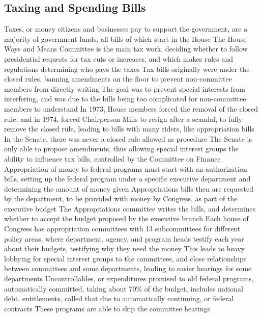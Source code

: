 \documentclass[11 pt, twoside]{article}
\newenvironment{outline*}
{
	\begin{outline}[enumerate]
	}
	{\end{outline}
}
\begin{document}
\subsection{Taxing and Spending Bills}
\begin{outline*}
\1 Taxes, or money citizens and businesses pay to support the government, are a majority of government funds, all bills of which start in the House
\2 The House Ways and Means Committee is the main tax work, deciding whether to follow presidential requests for tax cuts or increases, and which makes rules and regulations determining who pays the taxes
\1 Tax bills originally were under the closed rules, banning amendments on the floor to prevent non-committee members from directly writing
\2 The goal was to prevent special interests from interfering, and was due to the bills being too complicated for non-committee members to understand
\2 In 1973, House members forced the removal of the closed rule, and in 1974, forced Chairperson Mills to resign after a scandal, to fully remove the closed rule, leading to bills with many riders, like appropriation bills
\2 In the Senate, there was never a closed rule allowed as procedure
\1 The Senate is only able to propose amendments, thus allowing special interest groups the ability to influence tax bills, controlled by the Committee on Finance
\1 Appropriation of money to federal programs must start with an authorization bills, setting up the federal program under a specific executive department and determining the amount of money given
\2 Appropriations bills then are requested by the department, to be provided with money by Congress, as part of the executive budget
\2 The Appropriations committee writes the bills, and determines whether to accept the budget proposed by the executive branch
\1 Each house of Congress has appropriation committees with 13 subcommittees for different policy areas, where department, agency, and program heads testify each year about their budgets, testifying why they need the money
\2 This leads to heavy lobbying for special interest groups to the committees, and close relationships between committees and some departments, leading to easier hearings for some departments
\1 Uncontrollables, or expenditures promised to old federal programs, automatically committed, taking about 70\% of the budget, includes national debt, entitlements, called that due to automatically continuing, or federal contracts
\2 These programs are able to skip the committee hearings
\end{outline*}
\end{document}
